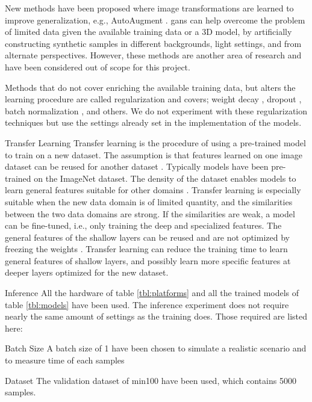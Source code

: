 \begin{enumdescript}
\begin{enumdescript}
		New methods have been proposed where image transformations are learned to improve generalization, e.g., AutoAugment \cite{cubuk_autoaugment:_2018}. \gls{gan}s can help overcome the problem of limited data given the available training data or a 3D model, by artificially constructing synthetic samples in different backgrounds, light settings, and from alternate perspectives. However, these methods are another area of research and have been considered out of scope for this project.
		
		Methods that do not cover enriching the available training data, but alters the learning procedure are called regularization and covers; weight decay \cite{krogh_simple_nodate}, dropout \cite{srivastava_dropout:_nodate}, batch normalization \cite{ioffe_batch_2015}, and others. We do not experiment with these regularization techniques but use the settings already set in the implementation of the models.
		
		\item[Transfer Learning] Transfer learning is the procedure of using a pre-trained model to train on a new dataset. The assumption is that features learned on one image dataset can be reused for another dataset \cite{yosinski_how_2014}. Typically models have been pre-trained on the ImageNet dataset. The density of the dataset enables models to learn general features suitable for other domains \cite{kornblith_better_2019}. Transfer learning is especially suitable when the new data domain is of limited quantity, and the similarities between the two data domains are strong. If the similarities are weak, a model can be fine-tuned, i.e., only training the deep and specialized features. The general features of the shallow layers can be reused and are not optimized by freezing the weights \cite{li_cs231n:_2018}. Transfer learning can reduce the training time to learn general features of shallow layers, and possibly learn more specific features at deeper layers optimized for the new dataset.
	\end{enumdescript}
	
	\item[Inference]  All the hardware of table \ref{tbl:platforms} and all the trained models of table \ref{tbl:models} have been used. The inference experiment does not require nearly the same amount of settings as the training does. Those required are listed here:
	\begin{enumdescript}
		\item[Batch Size] A batch size of 1 have been chosen to simulate a realistic scenario and to measure time of each samples
		\item[Dataset] The validation dataset of \gls{min100} have been used, which contains 5000 samples.
	\end{enumdescript} 
	
\end{enumdescript}

